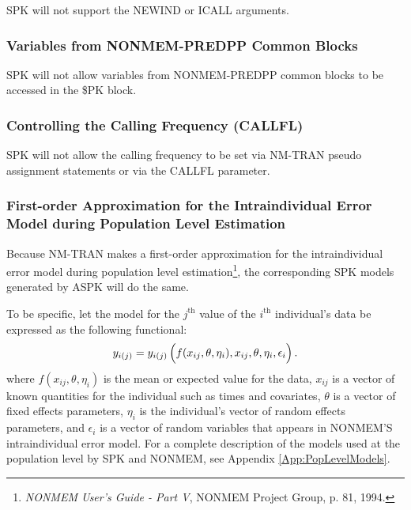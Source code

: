\documentclass{article}
\begin{document}
SPK will not support the NEWIND or ICALL arguments.


\subsubsection{Variables from NONMEM-PREDPP Common Blocks}

SPK will not allow variables from NONMEM-PREDPP common blocks to be
accessed in the \$PK block.


\subsubsection{Controlling the Calling Frequency (CALLFL)}

SPK will not allow the calling frequency to be set via NM-TRAN
pseudo assignment statements or via the CALLFL parameter.


\subsubsection{First-order Approximation for the Intraindividual Error Model
  during Population Level Estimation}

Because NM-TRAN makes a first-order approximation for the 
intraindividual error model during population level 
estimation\footnote{
  {\em NONMEM User's Guide - Part V}, NONMEM Project Group, 
  p. 81, 1994.
},
the corresponding SPK models generated by ASPK will do the same.

To be specific, let the model for 
the $j^{\mbox{th}}$ value of the $i^{\mbox{th}}$ individual's data
be expressed as the following functional:
  \begin{equation}
    y_{i(j)} = y_{i(j)}\left( \rule{0.0in}{0.15in}
      f(x_{ij}, \theta, \eta_i), x_{ij}, \theta, \eta_i, \epsilon_i \right) .
  \end{equation}
where $f(x_{ij}, \theta, \eta_i)$ is the mean or expected value 
for the data,
$x_{ij}$ is a vector of known quantities for the individual
such as times and covariates,
$\theta$ is a vector of fixed effects parameters,
$\eta_i$ is the individual's vector of random effects parameters,
and $\epsilon_i$ is a vector of random variables that appears in
NONMEM'S intraindividual error model.
For a complete description of the models used at the population 
level by SPK and NONMEM, see Appendix \ref{App:PopLevelModels}.
\end{document}
